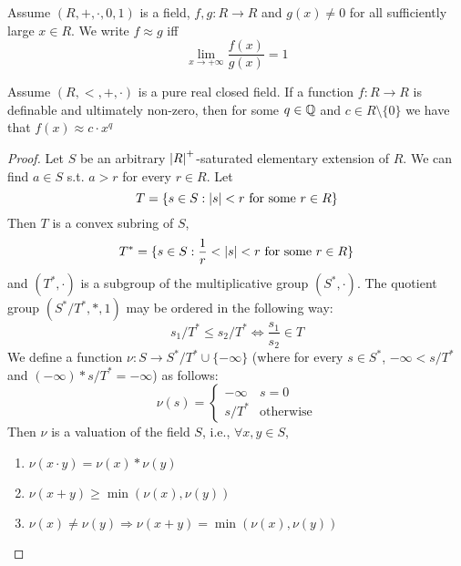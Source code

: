 \documentclass[11pt]{article}
\begin{document}
\begin{definition}[]
Assume \((R,+,\cdot,0,1)\) is a field, \(f,g:R\to R\) and \(g(x)\neq 0\) for all sufficiently
large \(x\in R\). We write \(f\approx g\) iff
\begin{equation*}
\lim_{x\to+\infty}\frac{f(x)}{g(x)}=1
\end{equation*}
\end{definition}

\begin{lemma}[]
\label{3.5.5}
Assume \((R,<,+,\cdot)\) is a pure real closed field. If a function \(f:R\to R\) is definable and
ultimately non-zero, then for some \(q\in\mathbb{Q}\) and \(c\in R\setminus\{0\}\) we have that \(f(x)\approx c\cdot x^q\)
\end{lemma}

\begin{proof}
Let \(S\) be an arbitrary \(\abs{R}^+\)-saturated elementary extension of \(R\). We can
find \(a\in S\) s.t. \(a>r\) for every \(r\in R\). Let
\begin{equation*}
T=\{s\in S:\abs{s}<r\text{ for some }r\in R\}
\end{equation*}
Then \(T\) is a convex subring of \(S\),
\begin{equation*}
T^*=\{s\in S:\frac{1}{r}<\abs{s}<r\text{ for some }r\in R\}
\end{equation*}
and \((T^*,\cdot)\) is a subgroup of the multiplicative group \((S^*,\cdot)\).
The quotient group \((S^*/T^*,*,1)\) may be ordered in the following way:
\begin{equation*}
s_1/T^*\le s_2/T^*\Leftrightarrow\frac{s_1}{s_2}\in T
\end{equation*}
We define a function \(\nu:S\to S^*/T^*\cup\{-\infty\}\) (where for every \(s\in S^*\), \(-\infty<s/T^*\)
and \((-\infty)* s/T^*=-\infty\)) as follows:
\begin{equation*}
\nu(s)=
\begin{cases}
-\infty&s=0\\
s/T^*&\text{otherwise}
\end{cases}
\end{equation*}
Then \(\nu\) is a valuation of the field \(S\), i.e., \(\forall x,y\in S\),
\begin{enumerate}
\item \(\nu(x\cdot y)=\nu(x)*\nu(y)\)
\item \(\nu(x+y)\ge\min(\nu(x),\nu(y))\)
\item \(\nu(x)\neq\nu(y)\Rightarrow\nu(x+y)=\min(\nu(x),\nu(y))\)


\end{enumerate}
\end{proof}
\end{document}
